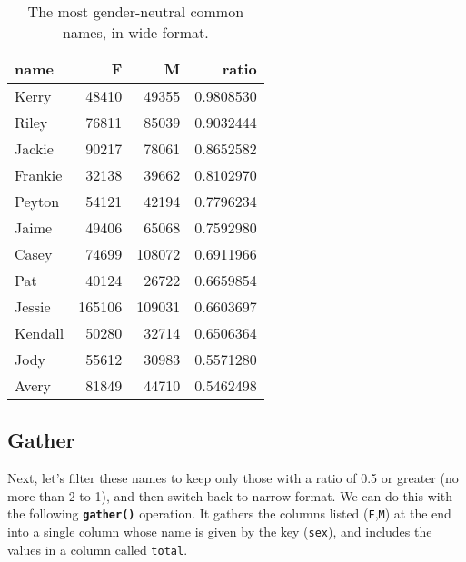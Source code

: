 \documentclass[]{tufte-handout}
\newenvironment{Shaded}{}{}
\newcommand{\KeywordTok}[1]{\textcolor[rgb]{0.00,0.44,0.13}{\textbf{{#1}}}}
\newcommand{\DataTypeTok}[1]{\textcolor[rgb]{0.56,0.13,0.00}{{#1}}}
\newcommand{\DecValTok}[1]{\textcolor[rgb]{0.25,0.63,0.44}{{#1}}}
\newcommand{\StringTok}[1]{\textcolor[rgb]{0.25,0.44,0.63}{{#1}}}
\newcommand{\NormalTok}[1]{{#1}}
\theoremstyle{definition}
\theoremstyle{definition}
\theoremstyle{definition}
\theoremstyle{remark}
\begin{document}
\begin{table}

\caption{\label{tab:unnamed-chunk-9}The most gender-neutral common names, in wide format.}
\centering
\begin{tabular}[t]{l|r|r|r}
\hline
name & F & M & ratio\\
\hline
Kerry & 48410 & 49355 & 0.9808530\\
\hline
Riley & 76811 & 85039 & 0.9032444\\
\hline
Jackie & 90217 & 78061 & 0.8652582\\
\hline
Frankie & 32138 & 39662 & 0.8102970\\
\hline
Peyton & 54121 & 42194 & 0.7796234\\
\hline
Jaime & 49406 & 65068 & 0.7592980\\
\hline
Casey & 74699 & 108072 & 0.6911966\\
\hline
Pat & 40124 & 26722 & 0.6659854\\
\hline
Jessie & 165106 & 109031 & 0.6603697\\
\hline
Kendall & 50280 & 32714 & 0.6506364\\
\hline
Jody & 55612 & 30983 & 0.5571280\\
\hline
Avery & 81849 & 44710 & 0.5462498\\
\hline
\end{tabular}
\end{table}

\subsection{Gather}\label{gather}

Next, let's filter these names to keep only those with a ratio of 0.5 or
greater (no more than 2 to 1), and then switch back to narrow format. We
can do this with the following \textbf{\texttt{gather()}} operation. It
gathers the columns listed (\texttt{F},\texttt{M}) at the end into a
single column whose name is given by the key (\texttt{sex}), and
includes the values in a column called \texttt{total}.

\begin{Shaded}
\end{Shaded}
\end{document}
